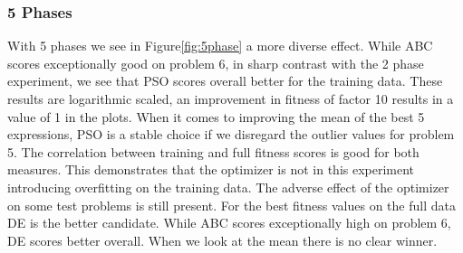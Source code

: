 \subsubsection{5 Phases}
With 5 phases we see in Figure\ref{fig:5phase} a more diverse effect. While ABC scores exceptionally good on problem 6, in sharp contrast with the 2 phase experiment, we see that PSO scores overall better for the training data. These results are logarithmic scaled, an improvement in fitness of factor 10 results in a value of 1 in the plots. When it comes to improving the mean of the best 5 expressions, PSO is a stable choice if we disregard the outlier values for problem 5. The correlation between training and full fitness scores is good for both measures. This demonstrates that the optimizer is not in this experiment introducing overfitting on the training data. The adverse effect of the optimizer on some test problems is still present.
For the best fitness values on the full data DE is the better candidate. While ABC scores exceptionally high on problem 6, DE scores better overall. When we look at the mean there is no clear winner. 
